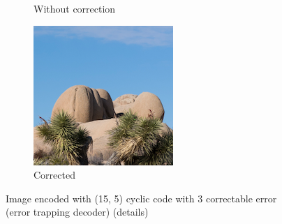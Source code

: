 \documentclass{article}
\begin{document}
\begin{figure}[htb]
\begin{subfigure}[b]{0.32\textwidth}
        \caption{Without correction}
        \label{fig:cropped-image-cyclic-15-5-no-correction}
    \end{subfigure}
    \hfill
    \begin{subfigure}[b]{0.32\textwidth}
        \centering
        \includegraphics[width=\textwidth]{../Result/Cyclic/15-5/cropped-cyclic-bsc-output-trapping-corrected.png}
        \caption{Corrected}
        \label{fig:cropped-image-cyclic-15-5-trapping-corrected}
    \end{subfigure}
       \caption{Image encoded with (15, 5) cyclic code with 3 correctable error (error trapping decoder) (details)}
       \label{fig:cropped-image-cyclic-15-5-trapping}
\end{figure}
\end{document}
